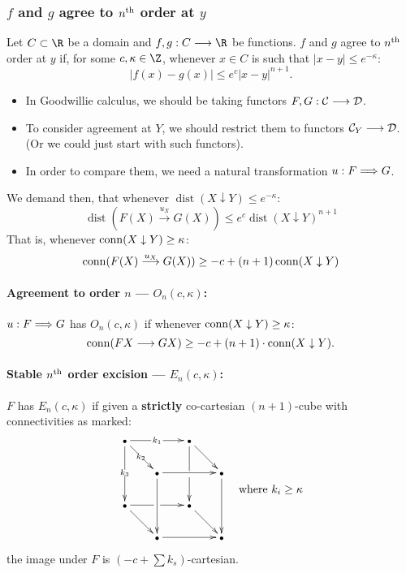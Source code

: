 \documentclass[11pt]{article}
\DeclareMathOperator{\dist}{dist}
\begin{document}
\begin{Calculus II}
\subsubsection*{$f$ and $g$ agree to $n^\textup{th}$ order at $y$}
Let $C\subset\R$ be a domain and $f,g:C\to\R$ be functions.
$f$ and $g$ agree to $n^\textup{th}$ order at $y$ if, for some $c,\kappa\in\Z$, whenever $x\in C$ is such that $|x-y|\leq e^{-\kappa}$:
\[|f(x)-g(x)|\leq e^c|x-y|^{n+1}.\]
\begin{itemize}\squishlist
\setlength{\parindent}{.25in}
\item In Goodwillie calculus, we should be taking functors $F,G:\mathcal{C}\longrightarrow\mathcal{D}$.
\item To consider agreement at $Y$, we should restrict them to functors $\mathcal{C}_Y\longrightarrow \mathcal{D}$. (Or we could just start with such functors).
\item In order to compare them, we need a natural transformation $u:F\Longrightarrow G$.
\end{itemize}
We demand then, that whenever $\dist(X\downarrow Y)\leq e^{-\kappa}$:
\[\dist(F(X)\overset{u_X}{\to} G(X))\leq e^c\dist(X\downarrow Y)^{n+1}\]
That is, whenever $\operatorname{conn}(X\downarrow Y)\geq\kappa$:
\[\operatorname{conn}(F(X)\overset{u_X}{\longrightarrow} G(X))\geq -c+(n+1)\operatorname{conn}(X\downarrow Y)\]
\paragraph*{Agreement to order $n$ --- $O_n(c,\kappa)$:}
$u:F\Longrightarrow G$ has $O_n(c,\kappa)$ if whenever $\operatorname{conn}(X\downarrow Y)\geq \kappa$:
\[\operatorname{conn}(FX\longrightarrow GX)\geq -c+(n+1)\cdot\operatorname{conn}(X\downarrow Y).\]


\paragraph*{Stable $n^\textup{th}$ order excision --- $E_n(c,\kappa)$:}
$F$ has $E_n(c,\kappa)$ if given a \textbf{strictly} co-cartesian $(n+1)$-cube with connectivities as marked:
\[\vcenter{\def\objectstyle{\scriptstyle} \xymatrix@!0@R=1cm@C=1cm{
\bullet   \ar[rr]|{\,k_1\,}\ar[rd]|{\,k_2\,}\ar[dd]|{k_3} &&%
\bullet   \ar'[d][dd]\ar[rd]\\&
\bullet  \ar[dd]\ar[rr] &&
\bullet  \ar[dd] \\
\bullet   \ar'[r][rr]\ar[rd] &&
\bullet   \ar[rd] \\&
\bullet  \ar[rr] &&
\bullet 
}}\textup{\quad where $k_i\geq\kappa$}\]
the image under $F$ is $(-c+\sum k_s)$-cartesian.

\pagebreak


\end{Calculus II}
\end{document}
